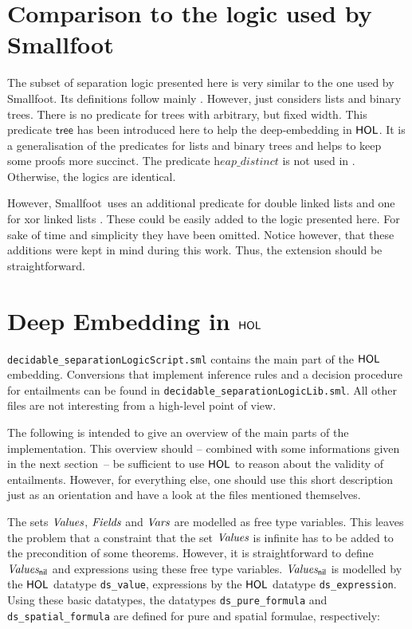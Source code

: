 \documentclass{scrartcl}
\theoremstyle{definition}
\newcommand{\smallfoot}{{\sf Smallfoot}}
\newcommand{\HOL}{{\sf HOL}}
\newcommand{\nil}{{\textsf{nil}}}
\newcommand{\values}{{\emph{Values}}}
\newcommand{\valuesnil}{\ensuremath{\values_\nil}}
\newcommand{\vars}{{\emph{Vars}}}
\newcommand{\fields}{{\emph{Fields}}}
\newcommand{\sftree}{{\textsf{tree}}}
\newcommand{\heapdistinct}{\textit{heap\_distinct}}
\begin{document}
\section{Comparison to the logic used by \smallfoot}

The subset of separation logic presented here is very similar to the one used by
\smallfoot. Its definitions follow mainly \cite{berdine05symbolic}. However,
\cite{berdine05symbolic} just considers lists and binary trees. There is no
predicate for trees with arbitrary, but fixed width. This predicate $\sftree$
has been introduced here to help the deep-embedding in $\HOL$. It is a
generalisation of the predicates for lists and binary trees and helps to keep
some proofs more succinct. The predicate $\heapdistinct$ is not used
in \cite{berdine05symbolic}. Otherwise, the logics are identical.

However, \smallfoot\ uses an additional predicate
for double linked lists and one for xor linked lists \cite{BerdineCO05}. These
could be easily added to the logic presented here. For sake of time and
simplicity they have been omitted. Notice however, that these additions were
kept in mind during this work. Thus, the extension should be
straightforward.



\section{Deep Embedding in $\HOL$}

\texttt{decidable\_separationLogicScript.sml} contains the main part of the
$\HOL$ embedding. Conversions that implement inference rules and a decision
procedure for entailments can be found in
\texttt{decidable\_separationLogicLib.sml}. All other files are not interesting from a high-level point
of view.

The following is intended to give an overview of the main parts of the
implementation. This overview should -- combined with some informations
given in the next section~-- be sufficient to use $\HOL$ to reason about the
validity of entailments. However, for everything else, one should use this
short description just as an orientation and have a look
at the files mentioned themselves.
\medskip

The sets $\values$, $\fields$ and $\vars$ are modelled as free type variables.
This leaves the problem that a constraint that the set $\values$ is infinite
has to be added to the precondition of some theorems. However, it is
straightforward to define $\valuesnil$ and expressions using these free type
variables. $\valuesnil$ is modelled by the $\HOL$ datatype
\texttt{ds\_value}, expressions by the $\HOL$ datatype
\texttt{ds\_expression}. Using these basic datatypes, the datatypes \texttt{ds\_pure\_formula} and
\texttt{ds\_spatial\_formula} are defined for pure and spatial formulae,
respectively:
\end{document}
